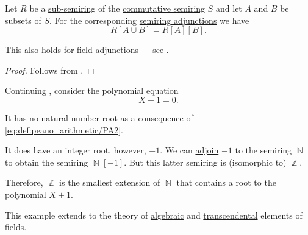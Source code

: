 \begin{proposition}\label{thm:semiring_adjunction_tower}
  Let \( R \) be a \hyperref[def:ring/submodel]{sub-semiring} of the \hyperref[def:semiring/commutative]{commutative semiring} \( S \) and let \( A \) and \( B \) be subsets of \( S \). For the corresponding \hyperref[def:semiring_adjunction]{semiring adjunctions} we have
  \begin{equation*}
    R[A \cup B] = R[A][B].
  \end{equation*}
\end{proposition}
\begin{comments}
  \item This also holds for \hyperref[def:field_adjunction]{field adjunctions} --- see .
\end{comments}
\begin{proof}
  Follows from .
\end{proof}

\begin{example}\label{ex:adjoining_root}
  Continuing , consider the polynomial equation
  \begin{equation*}
    X + 1 = 0.
  \end{equation*}

  It has no natural number root as a consequence of \eqref{eq:def:peano_arithmetic/PA2}.

  It does have an integer root, however, \( -1 \). We can \hyperref[def:semiring_adjunction]{adjoin} \( -1 \) to the semiring \( \BbbN \) to obtain the semiring \( \BbbN[-1] \). But this latter semiring is (isomorphic to) \( \BbbZ \).

  Therefore, \( \BbbZ \) is the smallest extension of \( \BbbN \) that contains a root to the polynomial \( X + 1 \).

  This example extends to the theory of \hyperref[def:algebraic_element]{algebraic} and \hyperref[def:transcendental_element]{transcendental} elements of fields.
\end{example}

